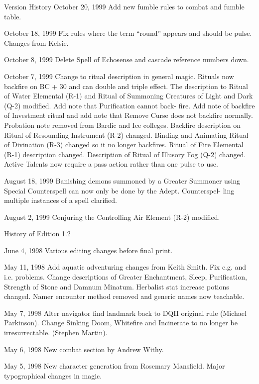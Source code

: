 \begin{Chapter}{Version History}
October 20, 1999 Add new fumble rules to combat 
and fumble table. 

October 18, 1999 Fix rules where the term “round” 
appears and should be pulse. Changes from Kelsie. 

October  8,  1999  Delete  Spell  of  Echosense  and 
cascade reference numbers down. 

October  7,  1999  Change  to  ritual  description  in 
general magic. Rituals now backfire on BC + 30%
and can double and triple effect. The description to 
Ritual  of  Water  Elemental  (R-1)  and  Ritual  of 
Summoning  Creatures  of  Light  and  Dark  (Q-2) 
modified.  Add  note  that  Purification  cannot  back-
fire. Add note of backfire of  Investment ritual and 
add  note  that  Remove  Curse  does  not  backfire 
normally. Probation note removed from Bardic and 
Ice  colleges.  Backfire  description  on  Ritual  of 
Resounding  Instrument  (R-2)  changed.  Binding 
and Animating Ritual of Divination (R-3) changed 
so  it  no  longer  backfires.  Ritual  of  Fire  Elemental 
(R-1) description changed. Description of Ritual of 
Illusory  Fog  (Q-2)  changed.  Active  Talents  now 
require a pass action rather than one pulse to use. 

August 18, 1999 Banishing demons summoned by 
a  Greater  Summoner  using  Special  Counterspell 
can now  only  be  done  by  the  Adept.  Counterspel-
ling multiple instances of a spell clarified. 

August  2,  1999  Conjuring  the  Controlling  Air 
Element (R-2) modified. 

History of Edition 1.2 

June  4,  1998  Various  editing  changes  before  final 
print. 

May  11,  1998  Add  aquatic  adventuring  changes 
from  Keith  Smith.  Fix  e.g.  and  i.e.  problems. 
Change  descriptions  of  Greater  Enchantment, 
Sleep, Purification, Strength of Stone and Damnum 
Minatum.  Herbalist  stat  increase  potions  changed. 
Namer  encounter  method  removed  and  generic 
names now teachable. 

May 7, 1998 Alter navigator find landmark back to 
DQII  original  rule  (Michael  Parkinson).  Change 
Sinking  Doom,  Whitefire  and  Incinerate  to  no 
longer be irresurrectable. (Stephen Martin). 

May  6,  1998  New  combat  section  by  Andrew 
Withy. 

May  5,  1998  New  character  generation  from 
Rosemary Mansfield. Major typographical changes 
in magic. 


\end{Chapter}
